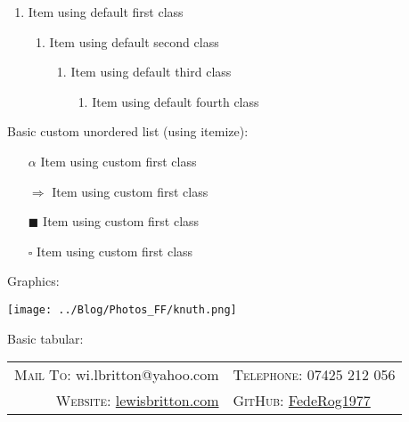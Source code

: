 \documentclass[11pt, english]{article}
\begin{document}
	\begin{enumerate}
	\setlength\itemsep{0cm}
                \item Item using default first class
                \begin{enumerate}        
                        \item Item using default second class
                        \begin{enumerate}
                                \item Item using default third class
                                \begin{enumerate}
                                        \item Item using default fourth class
                                \end{enumerate}   
                        \end{enumerate}
                \end{enumerate}
        \end{enumerate}

	Basic custom unordered list (using itemize):

	\begin{itemize}
	\setlength\itemsep{0cm}
		\item[$\alpha$] Item using custom first class
		\item[$\Longrightarrow$] Item using custom first class
		\item[$\blacksquare$] Item using custom first class
		\item[$\square$] Item using custom first class
        \end{itemize}

	\newpage

	Graphics:

	\begin{center}
                \texttt{[image: ../Blog/Photos\_FF/knuth.png]}
        \end{center}

	\newpage

	Basic tabular:

	\begin{center}
                \small
        \begin{tabular}{r|l}
                \textsc{Mail To:} wi.lbritton@yahoo.com & \textsc{Telephone:} 07425 212 056\\
                \textsc{Website:} \href{http://lewisbritton.com}{lewisbritton.com} & \textsc{GitHub:} \href{https://github.com/FedeRog1977}{FedeRog1977}\\
        \end{tabular}
        \end{center}
\end{document}
